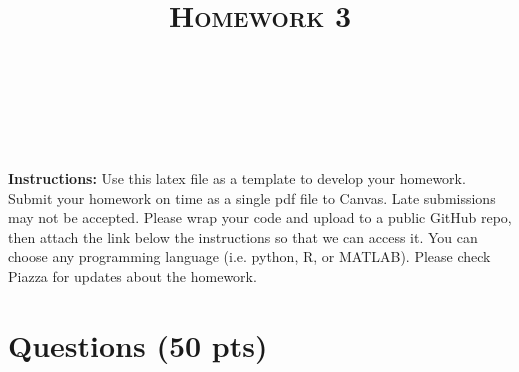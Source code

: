 \documentclass[a4paper]{article}
\title{\textsc{Homework 3}} %
\author{
\red{Matt Myers} \\
\red{908-464-4252}\\
\red{\href{https://github.com/myersmt/Hw003-Comp760}{GitHub}}\\
}
\date{}
\theoremstyle{definition}
\begin{document}
\maketitle 


\textbf{Instructions:} 
Use this latex file as a template to develop your homework. Submit your homework on time as a single pdf file to Canvas. Late submissions may not be accepted. Please wrap your code and upload to a public GitHub repo, then attach the link below the instructions so that we can access it. You can choose any programming language (i.e. python, R, or MATLAB). Please check Piazza for updates about the homework.

\section{Questions (50 pts)}
\end{document}
